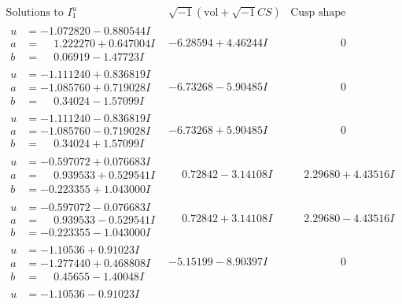 \documentclass[1p]{elsarticle_modified}
\theoremstyle{definition}
\newcommand{\I}{\sqrt{-1}}
\begin{document}
$$\begin{array}{c|c|c}
\text{Solutions to }I^u_{1}& \I (\text{vol} + \sqrt{-1}CS) & \text{Cusp shape}\\
 \hline 
\begin{aligned}
u &= -1.072820 - 0.880544 I \\
a &= \phantom{-}1.222270 + 0.647004 I \\
b &= \phantom{-}0.06919 - 1.47723 I\end{aligned}
 & -6.28594 + 4.46244 I & \phantom{-0.000000 } 0 \\ \hline\begin{aligned}
u &= -1.111240 + 0.836819 I \\
a &= -1.085760 + 0.719028 I \\
b &= \phantom{-}0.34024 - 1.57099 I\end{aligned}
 & -6.73268 - 5.90485 I & \phantom{-0.000000 } 0 \\ \hline\begin{aligned}
u &= -1.111240 - 0.836819 I \\
a &= -1.085760 - 0.719028 I \\
b &= \phantom{-}0.34024 + 1.57099 I\end{aligned}
 & -6.73268 + 5.90485 I & \phantom{-0.000000 } 0 \\ \hline\begin{aligned}
u &= -0.597072 + 0.076683 I \\
a &= \phantom{-}0.939533 + 0.529541 I \\
b &= -0.223355 + 1.043000 I\end{aligned}
 & \phantom{-}0.72842 - 3.14108 I & \phantom{-}2.29680 + 4.43516 I \\ \hline\begin{aligned}
u &= -0.597072 - 0.076683 I \\
a &= \phantom{-}0.939533 - 0.529541 I \\
b &= -0.223355 - 1.043000 I\end{aligned}
 & \phantom{-}0.72842 + 3.14108 I & \phantom{-}2.29680 - 4.43516 I \\ \hline\begin{aligned}
u &= -1.10536 + 0.91023 I \\
a &= -1.277440 + 0.468808 I \\
b &= \phantom{-}0.45655 - 1.40048 I\end{aligned}
 & -5.15199 - 8.90397 I & \phantom{-0.000000 } 0 \\ \hline\begin{aligned}
u &= -1.10536 - 0.91023 I \\

\end{aligned}
\end{array}$$
\end{document}
